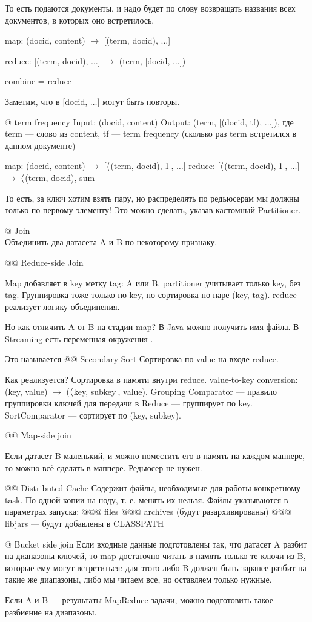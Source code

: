 \begin{el}[ul]
То есть подаются документы, и надо будет по слову возвращать названия всех документов, в которых оно встретилось.

map: (docid, content) $\to$ [(term, docid), $\dots$]

reduce: [(term, docid), $\dots$] $\to$ (term, [docid, $\dots$])

combine = reduce

Заметим, что в [docid, $\dots$] могут быть повторы.

@ term frequency
Input: (docid, content)
Output: (term, [(docid, tf), $\dots$]), где term --- слово из content, tf --- term frequency (сколько раз term встретился в данном документе)

map: (docid, content) $\to$ [$\langle$(term, docid), 1$\>$, $\dots$]
reduce: [$\langle$(term, docid), 1$\>$, $\dots$] $\to$ $\langle$(term, docid), sum$\>$

То есть, за ключ хотим взять пару, но распределять по редьюсерам мы должны только по первому элементу!
Это можно сделать, указав кастомный Partitioner.

@ Join\\
Объединить два датасета A и B по некоторому признаку.

@@ Reduce-side Join

Map добавляет в key метку tag: A или B. partitioner учитывает только key, без tag. Группировка тоже только по key, но сортировка по паре (key, tag). reduce реализует логику объединения.

Но как отличить A от B на стадии map? В Java можно получить имя файла. В Streaming есть переменная окружения .

Это называется 
@@ Secondary Sort
Сортировка по value на входе reduce.

Как реализуется?
Сортировка в памяти внутри reduce.
value-to-key conversion:
(key, value) $\to$ ($\langle$key, subkey$\>$, value).
Grouping Comparator --- правило группировки ключей для передачи в Reduce --- группирует по key.
SortComparator --- сортирует по (key, subkey).

@@ Map-side join

Если датасет B маленький, и можно поместить его в память на каждом маппере, то можно всё сделать в маппере. Редьюсер не нужен.

@@ Distributed Cache
Содержит файлы, необходимые для работы конкретному task. По одной копии на ноду, т. е. менять их нельзя.
Файлы указываются в параметрах запуска:
@@@ files
@@@ archives (будут разархивированы)
@@@ libjars --- будут добавлены в CLASSPATH

@ Bucket side join
Если входные данные подготовлены так, что датасет A разбит на диапазоны ключей, то map достаточно читать в память только те ключи из B, которые ему могут встретиться: для этого либо B должен быть заранее разбит на такие же диапазоны, либо мы читаем все, но оставляем только нужные.

Если A и B --- результаты MapReduce задачи, можно подготовить такое разбиение на диапазоны.
\end{el}




